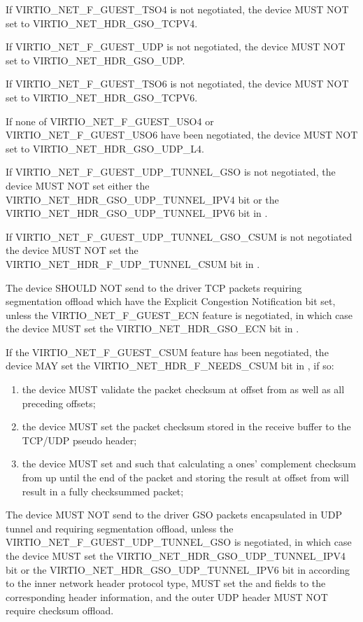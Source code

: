 If VIRTIO_NET_F_GUEST_TSO4 is not negotiated, the device MUST NOT set
 to VIRTIO_NET_HDR_GSO_TCPV4.

If VIRTIO_NET_F_GUEST_UDP is not negotiated, the device MUST NOT set
 to VIRTIO_NET_HDR_GSO_UDP.

If VIRTIO_NET_F_GUEST_TSO6 is not negotiated, the device MUST NOT set
 to VIRTIO_NET_HDR_GSO_TCPV6.

If none of VIRTIO_NET_F_GUEST_USO4 or VIRTIO_NET_F_GUEST_USO6 have been negotiated,
the device MUST NOT set  to VIRTIO_NET_HDR_GSO_UDP_L4.

If VIRTIO_NET_F_GUEST_UDP_TUNNEL_GSO is not negotiated, the device MUST NOT set
either the VIRTIO_NET_HDR_GSO_UDP_TUNNEL_IPV4 bit or the
VIRTIO_NET_HDR_GSO_UDP_TUNNEL_IPV6 bit in .

If VIRTIO_NET_F_GUEST_UDP_TUNNEL_GSO_CSUM is not negotiated the device MUST NOT set
the VIRTIO_NET_HDR_F_UDP_TUNNEL_CSUM bit in .

The device SHOULD NOT send to the driver TCP packets requiring segmentation offload
which have the Explicit Congestion Notification bit set, unless the
VIRTIO_NET_F_GUEST_ECN feature is negotiated, in which case the
device MUST set the VIRTIO_NET_HDR_GSO_ECN bit in
.

If the VIRTIO_NET_F_GUEST_CSUM feature has been negotiated, the
device MAY set the VIRTIO_NET_HDR_F_NEEDS_CSUM bit in
, if so:
\begin{enumerate}
\item the device MUST validate the packet checksum at
	offset  from  as well as all
	preceding offsets;
\item the device MUST set the packet checksum stored in the
	receive buffer to the TCP/UDP pseudo header;
\item the device MUST set  and
	 such that calculating a ones'
	complement checksum from  up until the
	end of the packet and storing the result at offset
	 from   will result in a
	fully checksummed packet;
\end{enumerate}

The device MUST NOT send to the driver GSO packets encapsulated in UDP
tunnel and requiring segmentation offload, unless the
VIRTIO_NET_F_GUEST_UDP_TUNNEL_GSO is negotiated, in which case the device MUST set
the VIRTIO_NET_HDR_GSO_UDP_TUNNEL_IPV4 bit or the VIRTIO_NET_HDR_GSO_UDP_TUNNEL_IPV6
bit in  according to the inner network header protocol type,
MUST set the  and  fields
to the corresponding header information, and the outer UDP header MUST NOT
require checksum offload.

